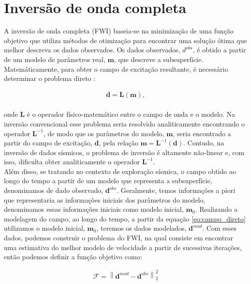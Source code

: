 \section{Inversão de onda completa}

A inversão de onda completa (FWI) baseia-se na minimização de uma função objetivo que utiliza métodos de otimização para encontrar uma solução ótima que melhor descreva os dados observados. Os dados observados, $d^{obs}$, é obtido a partir de um modelo de parâmetros real, $\mathbf{m}$, que descreve a subsuperfície. Matemáticamente, para obter o campo de excitação resultante, é necessário determinar o problema direto \citep{menke_1989}:

\begin{eqnarray}
\mathbf{d} = \mathbf{L}(\mathbf{m}),
\label{eq:campo_direto}
\end{eqnarray}
\\
onde $\mathbf{L}$ é o operador físico-matemático entre o campo de onda e o modelo. Na inversão convencional esse problema seria resolvido analiticamente encontrando o operador $\mathbf{L}^{-1}$, de modo que os parâmetros do modelo, $\mathbf{m}$, seria encontrado a partir do campo de excitação, $\mathbf{d}$, pela relação $\mathbf{m} = \mathbf{L}^{-1}(\mathbf{d})$. Contudo, na inversão de dados sísmicos, o problema de inversão é altamente não-linear e, com isso,  dificulta obter analiticamente o operador $\mathbf{L}^{-1}$. \\

Além disso, se tratando no contexto de exploração sísmica, o campo obtido ao longo do tempo a partir de um modelo que representa a subsuperfície, denominamos de dado observado, $\mathbf{d}^{obs}$. Geralmente, temos informações a piori  que representaria as informações iniciais dos parâmetros do modelo, denominamos essas informações iniciais como modelo inicial, $\mathbf{m}_{0}$. Realizando a modelagem do campo, ao longo do tempo, a partir da equação \ref{eq:campo_direto} utilizamos o modelo inicial, $\mathbf{m}_{0}$, teremos os dados modelados, $\mathbf{d}^{mod}$. Com esses dados, podemos construir o problema do FWI, na qual consiste em encontrar uma estimativa do melhor modelo de velocidade a partir de sucessivas iterações, então podemos definir a função objetivo como:

\begin{eqnarray}
       \mathcal{F} = \left \| \mathbf{d}^{mod} - \mathbf{d}^{obs} \right \| ^{2}_{2} 
\end{eqnarray}
\\

